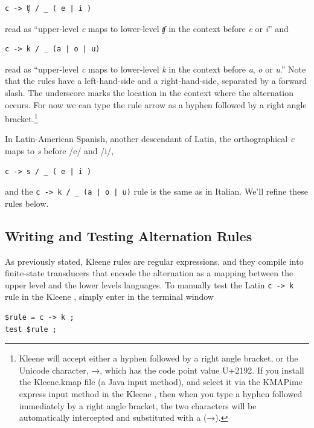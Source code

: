 \begin{Verbatim}
c -> ʧ / _ ( e | i )
\end{Verbatim}

\noindent
read as ``upper-level \emph{c} maps to lower-level \emph{ʧ} in the context before \emph{e} or \emph{i}'' and

\begin{Verbatim}
c -> k / _ (a | o | u)
\end{Verbatim}

\noindent
read as ``upper-level \emph{c} maps to lower-level \emph{k} in the context before \emph{a}, \emph{o} or \emph{u}.''
Note that the rules have a left-hand-side and a right-hand-side, separated by a forward slash.  The underscore marks
the location in the context where the alternation occurs.  For now we can type the rule arrow as a hyphen followed by a
right angle bracket.\footnote{Kleene will accept either a hyphen
followed by a right angle bracket, or the Unicode  character, →, which has the code point value U+2192.  If you
install the Kleene.kmap file (a Java input method), and select
it via the KMAPime express input method in the Kleene , then when you type a hyphen followed immediately by a
right angle bracket, the two characters will be automatically
intercepted and substituted with a  (→).}

In Latin-American Spanish, another descendant of Latin, the orthographical \emph{c} maps to \emph{s} before /e/ and /i/, 

\begin{Verbatim}
c -> s / _ ( e | i )
\end{Verbatim}

\noindent
and the \verb!c -> k / _ (a | o | u)! rule is the same as in Italian.  We'll refine these rules below.

\subsection{Writing and Testing Alternation Rules}

As previously stated, Kleene rules are regular expressions, and they compile into finite-state
transducers that encode the alternation as a mapping between the upper level and the lower
levels languages.  To manually test the Latin \texttt{c -> k} rule in the Kleene , simply
enter in the terminal window

\begin{Verbatim}
$rule = c -> k ;
test $rule ;
\end{Verbatim}

